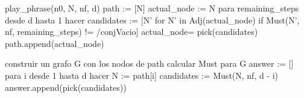 \begin{algoritmo}
play_phrase(n0, N, nf, d)
    path := [N]
    actual_node := N
    para remaining_steps desde d hasta 1 hacer
        candidates := [N' for N' in Adj(actual_node) if Must(N', nf, remaining_steps) != /conjVacio]
        actual_node= pick(candidates)
        path.append(actual_node)

    construir un grafo G con los nodos de path
    calcular Must para G
    answer := []
    para i desde 1 hasta d hacer
        N := path[i] 
        candidates := Must(N, nf, d - i)
        answer.append(pick(candidates)) 

\end{algoritmo}



